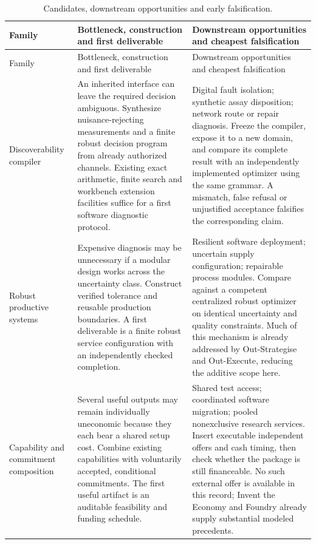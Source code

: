 \documentclass[11pt,letterpaper]{article}
\theoremstyle{definition}\newtheorem{definition}[theorem]{Definition}
\theoremstyle{remark}\newtheorem{remark}[theorem]{Remark}
\begin{document}
\begin{longtable}{@{}P{.20\linewidth}P{.36\linewidth}P{.38\linewidth}@{}}
\caption{Candidates, downstream opportunities and early falsification.}\label{tab:candidates}\\
\toprule
Family & Bottleneck, construction and first deliverable & Downstream opportunities and cheapest falsification \\
\midrule
\endfirsthead
\toprule Family & Bottleneck, construction and first deliverable & Downstream opportunities and cheapest falsification \\\midrule
\endhead
Discoverability compiler &
An inherited interface can leave the required decision ambiguous. Synthesize nuisance-rejecting measurements and a finite robust decision program from already authorized channels. Existing exact arithmetic, finite search and workbench extension facilities suffice for a first software diagnostic protocol. &
Digital fault isolation; synthetic assay disposition; network route or repair diagnosis. Freeze the compiler, expose it to a new domain, and compare its complete result with an independently implemented optimizer using the same grammar. A mismatch, false refusal or unjustified acceptance falsifies the corresponding claim. \\[.35em]
Robust productive systems &
Expensive diagnosis may be unnecessary if a modular design works across the uncertainty class. Construct verified tolerance and reusable production boundaries. A first deliverable is a finite robust service configuration with an independently checked completion. &
Resilient software deployment; uncertain supply configuration; repairable process modules. Compare against a competent centralized robust optimizer on identical uncertainty and quality constraints. Much of this mechanism is already addressed by Out-Strategise and Out-Execute, reducing the additive scope here. \\[.35em]
Capability and commitment composition &
Several useful outputs may remain individually uneconomic because they each bear a shared setup cost. Combine existing capabilities with voluntarily accepted, conditional commitments. The first useful artifact is an auditable feasibility and funding schedule. &
Shared test access; coordinated software migration; pooled nonexclusive research services. Insert executable independent offers and cash timing, then check whether the package is still financeable. No such external offer is available in this record; Invent the Economy and Foundry already supply substantial modeled precedents. \\
\bottomrule
\end{longtable}
\end{document}
